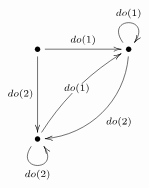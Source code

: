 $\xymatrix{
   \bullet \ar[rr]^{do(1)} \ar[dd]_{do(2)} && \bullet \ar@(ul,ur)^{do(1)} \ar@(d,r)[ddll]^{do(2)} \\ \\
   \bullet \ar@/^/[uurr]|-{do(1)} \ar@(dl,dr)[]_{do(2)}}$